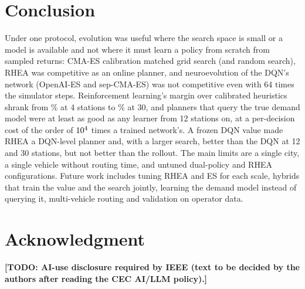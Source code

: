 \documentclass[conference,a4paper]{IEEEtran}
\newcommand{\TODO}[1]{\textbf{[TODO: #1]}}
\begin{document}
\section{Conclusion}
Under one protocol, evolution was useful where the search space is small or a model is available and not where it must learn a policy from scratch from sampled returns:
CMA-ES calibration matched grid search (and random search), RHEA was competitive as an online planner, and neuroevolution of the DQN's network (OpenAI-ES and sep-CMA-ES) was not competitive even with 64
times the simulator steps. Reinforcement learning's margin over calibrated heuristics shrank from \cecRDqnA\% at 4 stations to \cecRDqnE\% at 30, and planners that query the
true demand model were at least as good as any learner from 12 stations on, at a per-decision cost of the order of $10^{4}$ times a trained network's. A frozen DQN value made RHEA a DQN-level planner and, with a larger search, better than the DQN at 12 and 30 stations, but not better than the rollout. The main limits are a
single city, a single vehicle without routing time, and untuned dual-policy and RHEA configurations. Future work includes tuning RHEA and ES for each scale, hybrids that train the value and the search jointly, learning
the demand model instead of querying it, multi-vehicle routing and validation on operator data.

\section*{Acknowledgment}
\TODO{AI-use disclosure required by IEEE (text to be decided by the authors after reading the CEC AI/LLM policy).}



\end{document}
